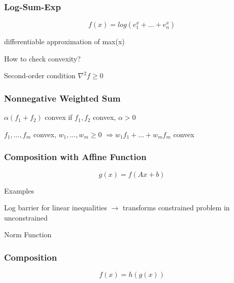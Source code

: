 \subsubsection{Log-Sum-Exp}

$$f(x) = log(e^x_1+...+e^x_n)$$

differentiable approximation of max(x)

How to check convexity?

Second-order condition $\nabla^2f\ge 0$

\subsubsection{Nonnegative Weighted Sum}

$\alpha(f_1 + f_2)$ convex if $f_1, f_2$ convex, $\alpha > 0$

$f_1,\dots,f_m$ convex, $w_1,\dots,w_m \ge 0$
$\Rightarrow w_1f_1+\dots+w_mf_m$ convex

\subsubsection{Composition with Affine Function }

$$g(x) =f(Ax+b) $$

Examples

Log barrier for linear inequalities
$\rightarrow$ transforms constrained problem in unconstrained

Norm Function

\subsubsection{Composition}

$$f(x)=h(g(x))$$
